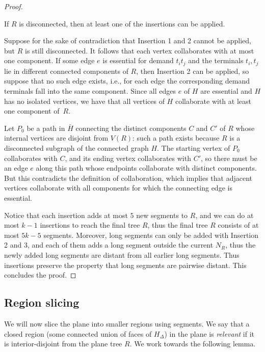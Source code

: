 \begin{proof}
\begin{claim}
If $R$ is disconnected, then at least one of the insertions can be applied.
\end{claim}
\begin{claimproof}
Suppose for the sake of contradiction that Insertion 1 and 2 cannot be applied, but $R$ is still disconnected. It follows that each vertex collaborates with at most one component. If some edge $e$ is essential for demand $t_it_j$ and the terminals $t_i,t_j$ lie in different connected components of $R$, then Insertion 2 can be applied, so suppose that no such edge exists, i.e., for each edge the corresponding demand terminals fall into the same component. Since all edges $e$ of $H$ are essential and $H$ has no isolated vertices, we have that all vertices of $H$ collaborate with at least one component of~$R$.

Let $P_0$ be a path in $\bar H$ connecting the distinct components $C$ and $C'$ of $R$ whose internal vertices are disjoint from $V(R)$: such a path exists because $R$ is a disconnected subgraph of the connected graph $H$. The starting vertex of $P_0$ collaborates with $C$, and its ending vertex collaborates with $C'$, so there must be an edge $e$ along this path whose endpoints collaborate with distinct components. But this contradicts the definition of collaboration, which implies that adjacent vertices collaborate with all components for which the connecting edge is essential.
\end{claimproof}

Notice that each insertion adds at most $5$ new segments to $R$, and we can do at most $k-1$ insertions to reach the final tree $R$, thus the final tree $R$ consists of at most $5k-5$ segments. Moreover, long segments can only be added with Insertion 2 and 3, and each of them adds a long segment outside the current $N_R$, thus the newly added long segments are distant from all earlier long segments. Thus insertions preserve the property that long segments are pairwise distant. This concludes the proof.
\end{proof}


\subsection{Region slicing}\label{sec:Sperner}

We will now slice the plane into smaller regions using segments. We say that a closed region (some connected union of faces of $H_\Delta$) in the plane is \emph{relevant} if it is interior-disjoint from the plane tree $R$.  We work towards the following lemma.

